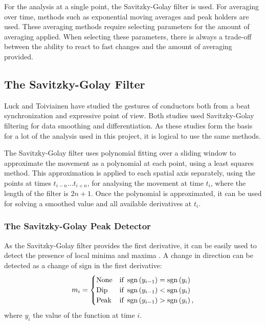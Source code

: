 For the analysis at a single point,
the Savitzky-Golay filter \cite{savitzky1964} is used.
For averaging over time, methods such as
exponential moving averages and peak holders are used.
These averaging methods require selecting 
parameters for the amount of averaging applied.
When selecting these parameters,
there is always a trade-off between the 
ability to react to fast changes
and the amount of averaging provided.

\subsection{The Savitzky-Golay Filter}

Luck and Toiviainen have studied the gestures of conductors
both from a beat synchronization \cite{luck2006}
and expressive \cite{luck2010} point of view.
Both studies used Savitzky-Golay filtering
for data smoothing and differentiation.
As these studies form the basis for a lot
of the analysis used in this project,
it is logical to use the same methods.

The Savitzky-Golay filter uses polynomial fitting
over a sliding window to approximate the movement
as a polynomial at each point,
using a least squares method.
This approximation is applied to each spatial axis separately,
using the points at times $t_{i-n} \ldots t_{i+n}$,
for analysing the movement at time $t_i$,
where the length of the filter is $2n + 1$.
Once the polynomial is approximated,
it can be used for solving a smoothed value and
all available derivatives at $t_i$.

\subsubsection*{The Savitzky-Golay Peak Detector}

As the Savitzky-Golay filter provides the first derivative,
it can be easily used to detect the presence of local minima and maxima
.
A change in direction can be detected as a change of sign in the first derivative:
\begin{equation}
m_i =
\begin{cases}
\mathrm{None} & \text{if } \operatorname{sgn} \left( y_{i-1} \right) = \operatorname{sgn} \left( y_{i} \right) \\
\mathrm{Dip} & \text{if } \operatorname{sgn} \left( y_{i-1} \right) < \operatorname{sgn} \left( y_{i} \right) \\
\mathrm{Peak} & \text{if } \operatorname{sgn} \left( y_{i-1} \right) > \operatorname{sgn} \left( y_{i} \right) ,
\end{cases}
\end{equation}
where $y_i$ the value of the function at time $i$.

